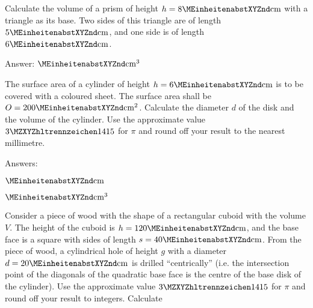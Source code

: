 \begin{MExercises}

\begin{MExercise}
Calculate the volume of a prism of height $h = 8\MEinheit{cm}$ with a triangle
as its base. Two sides of this triangle are of length $5\MEinheit{cm}$, 
and one side is of length $6\MEinheit{cm}$.
\par
Answer: $\MEinheit{cm}^3$
\end{MExercise}

\begin{MExercise}
The surface area of a cylinder of height $h = 6\MEinheit{cm}$ is to be covered 
with a coloured sheet. The surface area shall be $O = 200\MEinheit{cm}^2$. 
Calculate the diameter $d$ of the disk and the volume of the cylinder. Use the approximate value $\MZahl{3}{1415}$ for 
$\pi$ and round off your result 
to the nearest millimetre.


Answers:
\begin{MExerciseItems}
\item %
 $\MEinheit{cm}$
\item %
 $\MEinheit{cm}^3$
\end{MExerciseItems}
\end{MExercise}

\begin{MExercise}
Consider a piece of wood with the shape of a rectangular cuboid with the volume
$V$. The height of the cuboid is $h = 120\MEinheit{cm}$, and the 
base face is a square with sides of length $s = 40\MEinheit{cm}$.
From the piece of wood, a cylindrical hole of height $g$ with a diameter 
$d = 20\MEinheit{cm}$ is drilled ``centrically'' (i.e. the intersection 
point of the diagonals of the quadratic base face is the centre of the 
base disk of the cylinder). Use the approximate value 
$\MZahl{3}{1415}$ for $\pi$ and round off your result to integers. Calculate


\end{MExercise}
\end{MExercises}
